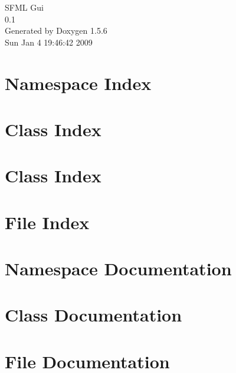 \documentclass[a4paper]{book}
\begin{document}
\begin{titlepage}
\vspace*{7cm}
\begin{center}
{\Large SFML Gui \\[1ex]\large 0.1 }\\
\vspace*{1cm}
{\large Generated by Doxygen 1.5.6}\\
\vspace*{0.5cm}
{\small Sun Jan 4 19:46:42 2009}\\
\end{center}
\end{titlepage}
\clearemptydoublepage
{}
\tableofcontents
\clearemptydoublepage
{}
\chapter{Namespace Index}

\chapter{Class Index}

\chapter{Class Index}

\chapter{File Index}

\chapter{Namespace Documentation}

\chapter{Class Documentation}






\chapter{File Documentation}













\printindex
\end{document}
